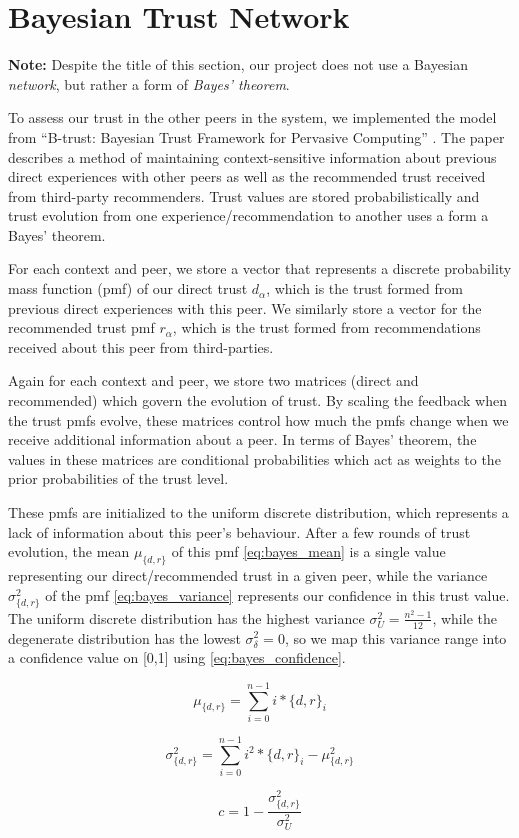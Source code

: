 \section{Bayesian Trust Network}
\textbf{Note:} Despite the title of this section, our project does not use a
Bayesian \emph{network}, but rather a form of \emph{Bayes' theorem}.

To assess our trust in the other peers in the system, we implemented
the model from ``B-trust: Bayesian Trust Framework for Pervasive Computing''
\cite{btrust}. The paper describes a method of maintaining context-sensitive
information about previous direct experiences with other peers as well as
the recommended trust received from third-party recommenders. Trust values
are stored probabilistically and trust evolution from one
experience/recommendation to another uses a form a Bayes' theorem.

For each context and peer, we store a vector that represents a discrete
probability mass function (pmf) of our direct trust $d_\alpha$, which is the
trust formed from previous direct experiences with this peer. We similarly store a
vector for the recommended trust pmf $r_\alpha$, which is the trust formed from
recommendations received about this peer from third-parties.

Again for each context and peer, we store two matrices (direct and recommended)
which govern the evolution of trust. By scaling the feedback when the trust
pmfs evolve, these matrices control how much the pmfs change when we receive
additional information about a peer. In terms of Bayes' theorem, the
values in these matrices are conditional probabilities which act as weights
to the prior probabilities of the trust level.

These pmfs are initialized to the uniform discrete distribution, which
represents a lack of information about this peer's behaviour. After a few rounds
of trust evolution, the mean $\mu_{\{d,r\}}$ of this pmf \eqref{eq:bayes_mean}
is a single value representing our direct/recommended trust in a given peer,
while the variance $\sigma^2_{\{d,r\}}$ of the pmf \eqref{eq:bayes_variance}
represents our confidence in this trust value. The uniform discrete distribution
has the highest variance $\sigma^2_U = \frac{n^2-1}{12}$, while the degenerate
distribution has the lowest $\sigma^2_\delta = 0$, so we map this variance range
into a confidence value on [0,1] using \eqref{eq:bayes_confidence}.

\begin{equation}
\label{eq:bayes_mean}
\mu_{\{d,r\}} = \sum_{i=0}^{n-1}{i*{\{d,r\}}_i}
\end{equation}

\begin{equation}
\label{eq:bayes_variance}
\sigma^2_{\{d,r\}} = \sum_{i=0}^{n-1}{i^2*{\{d,r\}}_i} - \mu^2_{\{d,r\}}
\end{equation}

\begin{equation}
\label{eq:bayes_confidence}
c = 1 - \frac{\sigma^2_{\{d,r\}}}{\sigma^2_U}
\end{equation}
